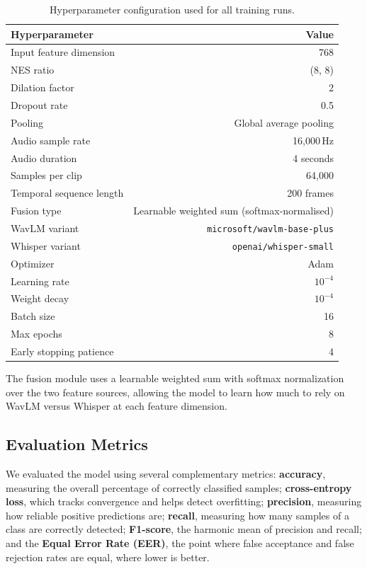 \documentclass[11pt,a4paper]{article}
\begin{document}
\begin{table}[htbp]
  \centering
  \caption{Hyperparameter configuration used for all training runs.}
  \label{tab:hparams}
  \begin{tabular}{lr}
    \toprule
    Hyperparameter & Value \\
    \midrule
    Input feature dimension  & 768 \\
    NES ratio                & (8, 8) \\
    Dilation factor          & 2 \\
    Dropout rate             & 0.5 \\
    Pooling                  & Global average pooling \\
    Audio sample rate        & 16,000\,Hz \\
    Audio duration           & 4 seconds \\
    Samples per clip         & 64,000 \\
    Temporal sequence length & 200 frames \\
    Fusion type              & Learnable weighted sum (softmax-normalised) \\
    WavLM variant            & \texttt{microsoft/wavlm-base-plus} \\
    Whisper variant          & \texttt{openai/whisper-small} \\
    Optimizer                & Adam \\
    Learning rate            & $10^{-4}$ \\
    Weight decay             & $10^{-4}$ \\
    Batch size               & 16 \\
    Max epochs               & 8 \\
    Early stopping patience  & 4 \\
    \bottomrule
  \end{tabular}
\end{table}

The fusion module uses a learnable weighted sum with softmax normalization over the
two feature sources, allowing the model to learn how much to rely on WavLM versus
Whisper at each feature dimension.

\subsection{Evaluation Metrics}

We evaluated the model using several complementary metrics: \textbf{accuracy},
measuring the overall percentage of correctly classified samples;
\textbf{cross-entropy loss}, which tracks convergence and helps detect
overfitting; \textbf{precision}, measuring how reliable positive predictions
are; \textbf{recall}, measuring how many samples of a class are correctly
detected; \textbf{F1-score}, the harmonic mean of precision and recall; and the
\textbf{Equal Error Rate (EER)}, the point where false acceptance and false
rejection rates are equal, where lower is better.
\end{document}
